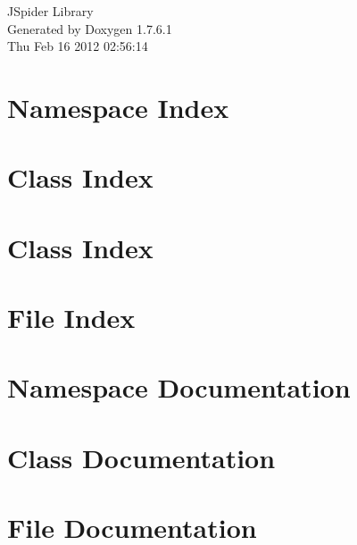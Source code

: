 \documentclass[a4paper]{book}
\begin{document}
\hypersetup{pageanchor=false,citecolor=blue}
\begin{titlepage}
\vspace*{7cm}
\begin{center}
{\Large \-J\-Spider \-Library }\\
\vspace*{1cm}
{\large \-Generated by Doxygen 1.7.6.1}\\
\vspace*{0.5cm}
{\small Thu Feb 16 2012 02:56:14}\\
\end{center}
\end{titlepage}
\clearemptydoublepage
{}
\tableofcontents
\clearemptydoublepage
{}
\hypersetup{pageanchor=true,citecolor=blue}
\chapter{\-Namespace \-Index}

\chapter{\-Class \-Index}

\chapter{\-Class \-Index}

\chapter{\-File \-Index}

\chapter{\-Namespace \-Documentation}



\chapter{\-Class \-Documentation}







\chapter{\-File \-Documentation}






\printindex
\end{document}
